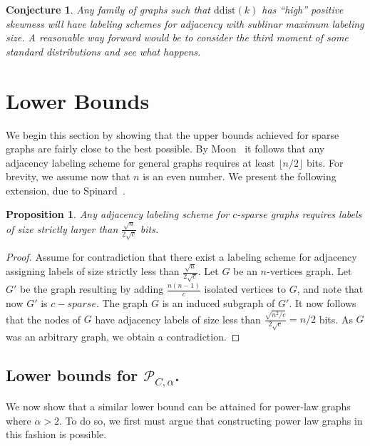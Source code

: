 \documentclass{article}
\newtheorem{proposition}{Proposition}
\newtheorem{conjecture}{Conjecture}
\theoremstyle{remark}
\begin{document}
\begin{conjecture}
Any family of graphs such that $\mathrm{ddist}(k)$ has ``high'' positive skewness will have labeling schemes for adjacency with
sublinar maximum labeling size. A reasonable way forward would be to consider the third moment of some standard distributions
and see what happens.
\end{conjecture}





\section{Lower Bounds}
We begin this section by showing that the upper bounds achieved for sparse graphs are fairly close to the best possible.
By Moon~\cite{moon1965minimal} it follows  that any adjacency labeling scheme for general graphs requires at least $\lfloor n/2 \rfloor$ bits.
For brevity, we assume now that $n$ is an even number.
We present the following extension, due to Spinard~\cite{spinrad2003efficient}.
\begin{proposition}
Any adjacency labeling scheme for $c$-sparse graphs requires  labels of size strictly larger than $\frac{\sqrt{n}}{2 \sqrt{c}}$ bits.
\end{proposition}
\begin{proof}
Assume for contradiction that there exist a labeling scheme for adjacency assigning labels of size strictly less than $\frac{\sqrt{n}}{2 \sqrt{c}}$.
Let $G$ be an $n$-vertices graph. Let $G'$ be the graph resulting by adding $\frac{n(n-1)}{c}$ isolated vertices to $G$, and note that now $G'$ is $c-sparse$. The graph $G$ is an induced subgraph of  $G'$.
It now follows that the nodes of $G$ have adjacency labels of size less than 
$ \frac{\sqrt{n^2/c}}{2 \sqrt{c}}= n/2$ bits. As $G$ was an arbitrary graph, we obtain a contradiction.
\end{proof}

\subsection{Lower bounds for $\mathcal{P}_{C,\alpha}$.}
We now show that a similar lower bound can be attained for power-law graphs where $\alpha>2$. To do so, we first must argue that  constructing power law graphs in  this fashion  is  possible.
\end{document}
